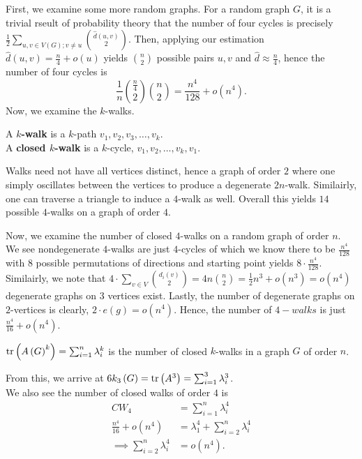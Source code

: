 First, we examine some more random graphs. For a random graph \(G\), it is a trivial rseult of probability theory that the number of four cycles is precisely \(\frac{1}{2}\sum_{u, v \in V\left( G \right); v\neq u}^{} \binom{\hat{d}\left( u, v \right) }{2}\). Then, applying our estimation \(\hat{d} \left( u, v \right) = \frac{n}{4 }+ o\left( u \right) \) yields \(\binom{n}{2}\) possible pairs \(u, v\) and \(\hat{d} \approx \frac{n}{4}\), hence the number of four cycles is \[
	\frac{1}{n}\binom{\frac{n}{4}}{2}\binom{n}{2} = \frac{n^{4}}{128} + o\left( n^{4} \right)
.\]
Now, we examine the \(k\)-walks.
\begin{definition}[Walks]
A \textbf{\(k\)-walk} is a \(k\)-path \(v_1, v_2, v_3, \ldots, v_{k}\).\\
A \textbf{closed \(k\)-walk} is a \(k\)-cycle, \(v_1, v_2, \ldots, v_{k}, v_1\).
\end{definition}
\begin{remark}
Walks need not have all vertices distinct, hence a graph of order \(2\) where one simply oscillates between the vertices to produce a degenerate \(2n\)-walk. Similairly, one can traverse a triangle to induce a \(4\)-walk as well. Overall this yields \(14\) possible \(4\)-walks on a graph of order \(4\).
\end{remark}
Now, we examine the number of closed \(4\)-walks on a random graph of order \(n\). We see nondegenerate \(4\)-walks are just \(4\)-cycles of which we know there to be \(\frac{n^{4}}{128}\) with \(8\) possible permutations of directions and starting point yields \(8 \cdot \frac{n^{4}}{128}\). Similairly, we note that \(4\cdot \sum_{v \in V}^{} \binom{d_{i}\left( v \right) }{2}= 4n\binom{n}{2} = \frac{1}{2}n^3 + o \left( n^3 \right) = o\left( n^{4} \right) \) degenerate graphs on \(3\) vertices exist. Lastly, the number of degenerate graphs on \(2\)-vertices is clearly, \(2\cdot e\left( g \right) = o\left( n^{4} \right)  \). Hence, the number of \(4-walks\) is just \(\frac{n^{4}}{16} + o \left( n^{4} \right) \).
\begin{proposition}
	\(\operatorname{tr}\left( A\left( G \right) ^{k} \right) = \sum_{i= 1}^{n} \lambda_{i}^{k} \) is the number of closed \(k\)-walks in a graph \(G\) of order \(n\).
\end{proposition}
From this, we arrive at \(6k_{3}\left( G \right) = \operatorname{tr}\left( A^3 \right) = \sum_{i= 1}^{3} \lambda_{i}^3\).\\
We also see the number of closed walks of order \(4\) is
\begin{align*}
	CW_4 &= \sum_{i= 1}^{n} \lambda_{i}^{4}\\
	\frac{n^{4}}{16} + o\left( n^{4} \right) 	&=  \lambda_1^{4} + \sum_{i=2}^{n} \lambda_{i}^{4}\\
\implies \sum_{i=2}^{n} \lambda_{i}^{4} &=  o\left( n^{4} \right)
.\end{align*}

